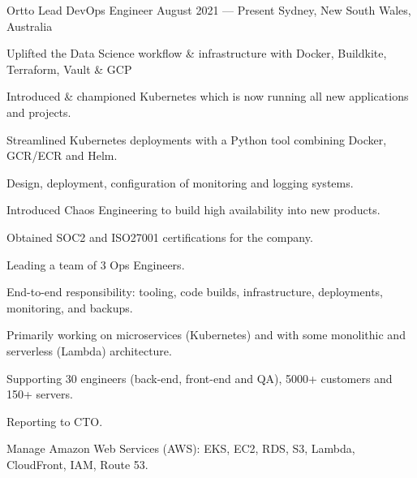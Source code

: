 
\begin{cventries}

  \cventry
  {Ortto} %
  {Lead DevOps Engineer} %
  {August 2021 --- Present} %
  {Sydney, New South Wales, Australia} %
  {
    \begin{cvitems}
      \item {Uplifted the Data Science workflow \& infrastructure with Docker, Buildkite, Terraform, Vault \& GCP}
      \item {Introduced \& championed Kubernetes which is now running all new applications and projects.}
      \item {Streamlined Kubernetes deployments with a Python tool combining Docker, GCR/ECR and Helm.}
      \item {Design, deployment, configuration of monitoring and logging systems.}
      \item {Introduced Chaos Engineering to build high availability into new products.}
      \item {Obtained SOC2 and ISO27001 certifications for the company.}
    \end{cvitems}
  }
  {
    \begin{cvitems}
      \item {Leading a team of 3 Ops Engineers.}
      \item {End-to-end responsibility: tooling, code builds, infrastructure, deployments, monitoring, and backups.}
      \item {Primarily working on microservices (Kubernetes) and with some monolithic and serverless (Lambda) architecture.}
      \item {Supporting 30 engineers (back-end, front-end and QA), 5000+ customers and 150+ servers.}
      \item {Reporting to CTO.}
    \end{cvitems}
  }
  {
    \begin{cvitems}
      \item {Manage Amazon Web Services (AWS): EKS, EC2, RDS, S3, Lambda, CloudFront, IAM, Route 53.}

\end{cvitems}}
\end{cventries}
